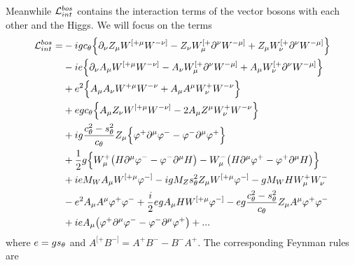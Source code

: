 Meanwhile $\mathcal{L}_{int}^{bos}$ contains the interaction terms of the vector
bosons with each other and the Higgs. We will focus on the terms
\begin{equation}
  \begin{aligned}
    \mathcal{L}_{int}^{bos}=&-igc_{\theta}\Big\{\partial_\nu Z_\mu W^{[+\mu}W^{-\nu ]}
                       -Z_\nu W_\mu^{[+}\partial^\nu W^{-\mu ]}
                       +Z_\mu W_\nu^{[+}\partial^\nu W^{-\mu ]}\Big\}\\
                      &-ie\Big\{\partial_\nu A_\mu W^{[+\mu}W^{-\nu]}
                       -A_\nu W_\mu^{[+}\partial^\nu W^{-\mu ]}
                       +A_\mu W_\nu^{[+}\partial^\nu W^{-\mu ]}\Big\}\\
                      &+e^2 \Big\{A_\mu A_\nu W^{+\mu}W^{-\nu}
                       +A_\mu A^\mu W^+_\nu W^{-\nu}\Big\}\\
                      &+egc_{\theta}\Big\{A_\mu Z_\nu W^{[+\mu}W^{-\nu ]}
                       -2A_\mu Z^\mu W^+_\nu W^{-\nu}\Big\}\\
                      &+ig\frac{c_{\theta}^2-s_{\theta}^2}{c_{\theta}}Z_\mu
                         \Big\{\varphi^+ \partial^\mu \varphi^-
                               -\varphi^- \partial^\mu \varphi^+ \Big\}\\
                      &+\frac{1}{2}g
                         \Big\{W_\mu^+\big(H\partial^\mu\varphi^- 
                               -\varphi^-\partial^\mu H\big)
                              -W_\mu^-\big(H\partial^\mu\varphi^+ 
                               -\varphi^+\partial^\mu H\big)\Big\}\\
                      &+ieM_W A_\mu W^{[+\mu}\varphi^{-]}
                       -igM_Z s_{\theta}^2 Z_\mu W^{[+\mu}\varphi^{-]}
                       -gM_W H W_\mu^+ W_\nu^- \\
                      &-e^2 A_\mu A^\mu \varphi^+ \varphi^-
                       +\frac{i}{2}egA_\mu HW^{[+\mu}\varphi^{-]}
                       -eg\frac{c_{\theta}^2-s_{\theta}^2}{c_{\theta}}Z_\mu A^\mu \varphi^+ \varphi^- \\
                      &+ieA_\mu \big(\varphi^+\partial^\mu\varphi^-
                                     -\varphi^-\partial^\mu\varphi^+\big)
                       +...
  \end{aligned}
\end{equation}
where $e=gs_{\theta}$ and $A^{[+}B^{-]}=A^+ B^- -B^- A^+$. The corresponding Feynman
rules are
